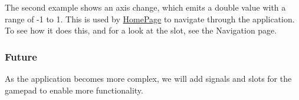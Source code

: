 The second example shows an axis change, which emits a double value with a range of -\/1 to 1. This is used by \mbox{\hyperlink{classHomePage}{Home\+Page}} to navigate through the application. To see how it does this, and for a look at the slot, see the Navigation page.

\subsubsection*{Future}

As the application becomes more complex, we will add signals and slots for the gamepad to enable more functionality. 